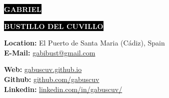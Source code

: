 \documentclass[9pt]{developercv} %
\begin{document}




\begin{minipage}[t]{0.45\textwidth} %
	\vspace{-\baselineskip} %
	
	\colorbox{black}{{\huge\textcolor{white}{\textbf{\MakeUppercase{Gabriel}}}}} %
	
	\colorbox{black}{{\huge\textcolor{white}{\textbf{\MakeUppercase{Bustillo del Cuvillo}}}}} %
	
	\vspace{6pt}
	
	{\huge \GetTitleLocalized{\langsa}{\jobtype}} %
\end{minipage}
\begin{minipage}[t]{0.233\textwidth} %
	\vspace{-\baselineskip} %
	
	\textbf{Location: }{El Puerto de Santa Maria (Cádiz), Spain}\\
	\textbf{E-Mail: }{\href{mailto:gabibust@gmail.com}{gabibust@gmail.com}}\\	
\end{minipage}
\begin{minipage}[t]{0.30\textwidth} %
	\vspace{-\baselineskip} %
	
	\textbf{Web: }{\href{https://gabuscuv.github.io}{gabuscuv.github.io}}\\
	\textbf{Github: }{\href{https://github.com/gabuscuv}{github.com/gabuscuv}}\\
	\textbf{Linkedin: }{\href{https://www.linkedin.com/in/gabuscuv/}{linkedin.com/in/gabuscuv/}}\\
\end{minipage}
\end{document}

